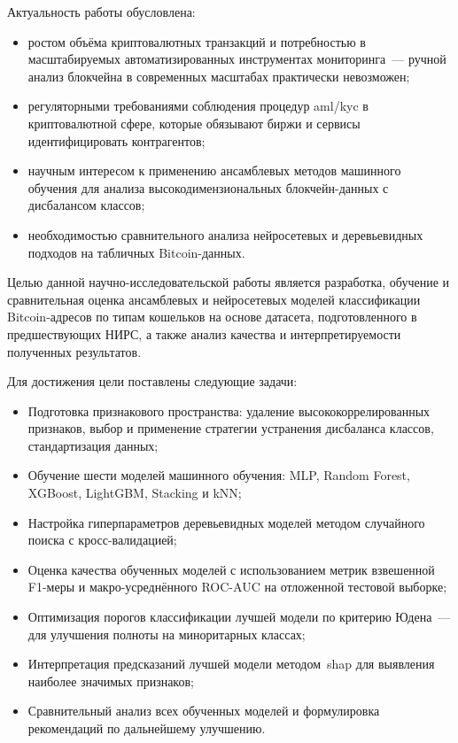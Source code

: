 Актуальность работы обусловлена:
\begin{itemize}
    \item ростом объёма криптовалютных транзакций и потребностью в масштабируемых автоматизированных инструментах мониторинга~--- ручной анализ блокчейна в современных масштабах практически невозможен;
    \item регуляторными требованиями соблюдения процедур \acrshort{aml}/\acrshort{kyc} в криптовалютной сфере, которые обязывают биржи и сервисы идентифицировать контрагентов;
    \item научным интересом к применению ансамблевых методов машинного обучения для анализа высокодимензиональных блокчейн-данных с дисбалансом классов;
    \item необходимостью сравнительного анализа нейросетевых и деревьевидных подходов на табличных Bitcoin-данных.
\end{itemize}

Целью данной научно-исследовательской работы является разработка, обучение и сравнительная оценка ансамблевых и нейросетевых моделей классификации Bitcoin-адресов по типам кошельков на основе датасета, подготовленного в предшествующих НИРС, а также анализ качества и интерпретируемости полученных результатов.

Для достижения цели поставлены следующие задачи:
\begin{itemize}
    \item Подготовка признакового пространства: удаление высококоррелированных признаков, выбор и применение стратегии устранения дисбаланса классов, стандартизация данных;
    \item Обучение шести моделей машинного обучения: MLP, Random Forest, XGBoost, LightGBM, Stacking и kNN;
    \item Настройка гиперпараметров деревьевидных моделей методом случайного поиска с кросс-валидацией;
    \item Оценка качества обученных моделей с использованием метрик взвешенной F1-меры и макро-усреднённого ROC-AUC на отложенной тестовой выборке;
    \item Оптимизация порогов классификации лучшей модели по критерию Юдена~--- для улучшения полноты на миноритарных классах;
    \item Интерпретация предсказаний лучшей модели методом~\acrshort{shap} для выявления наиболее значимых признаков;
    \item Сравнительный анализ всех обученных моделей и формулировка рекомендаций по дальнейшему улучшению.
\end{itemize}
